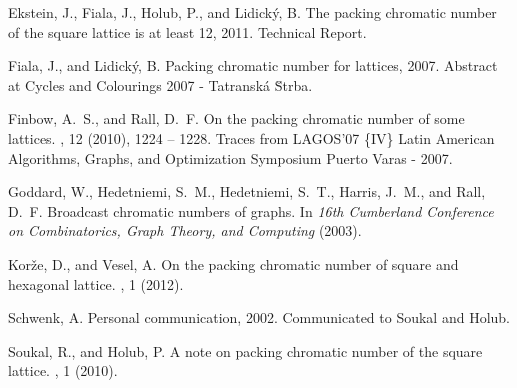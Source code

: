 \documentclass[a4paper,12pt]{article}
\theoremstyle{remark}
\begin{document}

\begin{thebibliography}{1}

{\sc Ekstein, J., Fiala, J., Holub, P., and Lidick\'y, B.}
\newblock The packing chromatic number of the square lattice is at least 12,
  2011.
\newblock Technical Report.

{\sc Fiala, J., and Lidick\'y, B.}
\newblock Packing chromatic number for lattices, 2007.
\newblock Abstract at Cycles and Colourings 2007 - Tatransk\'a \u{S}trba.

{\sc Finbow, A.~S., and Rall, D.~F.}
\newblock On the packing chromatic number of some lattices.
, 12 (2010), 1224 -- 1228.
\newblock Traces from LAGOS’07 \{IV\} Latin American Algorithms, Graphs, and
  Optimization Symposium Puerto Varas - 2007.

{\sc Goddard, W., Hedetniemi, S.~M., Hedetniemi, S.~T., Harris, J.~M., and
  Rall, D.~F.}
\newblock Broadcast chromatic numbers of graphs.
\newblock In {\em 16th Cumberland Conference on Combinatorics, Graph Theory,
  and Computing\/} (2003).

{\sc Korže, D., and Vesel, A.}
\newblock On the packing chromatic number of square and hexagonal lattice.
, 1 (2012).

{\sc Schwenk, A.}
\newblock Personal communication, 2002.
\newblock Communicated to Soukal and Holub.

{\sc Soukal, R., and Holub, P.}
\newblock A note on packing chromatic number of the square lattice.
, 1 (2010).

\end{thebibliography}
\end{document}
